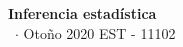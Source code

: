 \documentclass[8pt,a4paper]{extarticle}
\renewcommand{\csClass}{Inferencia estadística}
\renewcommand{\csClassCode}{EST - 11102}
\renewcommand{\csTerm}{Otoño 2020}
\begin{document}
\begin{titlepage}
    \begin{center}
        \vspace*{1cm}
        \Huge
        \textbf{\csClass}
        \vspace{0.5cm} \\
        \Large
        \cs\ $\cdot$ \csTerm
        \vfill
        \csAuthorName
        \vspace{0.8cm}
        \csClassCode\\
        \csSchool
    \end{center}
\end{titlepage}

\begin{multicols}{3}
    \setcounter{page}{1}

    \vfill\eject
    \columnbreak
\end{multicols}
\end{document}
